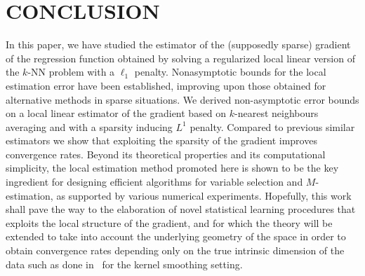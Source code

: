 \section{CONCLUSION}\label{sec:conclusion}
In this paper, we have studied the estimator of the (supposedly sparse) gradient of the regression function obtained by solving a regularized local linear version of the $k$-NN problem with a $\ell_1$ penalty. Nonasymptotic bounds for the local estimation error have been established, improving upon those obtained for alternative methods in sparse situations.
We derived non-asymptotic error bounds on a local linear estimator of the gradient based on $k$-nearest neighbours averaging and with a sparsity inducing $L^1$ penalty. Compared to previous similar estimators we show that exploiting the sparsity of the gradient improves convergence rates.
Beyond its theoretical properties and its computational simplicity, the local estimation method promoted here is shown to be the key ingredient for designing efficient algorithms for variable selection and $M$-estimation, as supported by various numerical experiments. Hopefully, this work shall pave the way to the elaboration of novel statistical learning procedures that exploits the local structure of the gradient, and for which the theory will be extended to take into account the underlying geometry of the space in order to obtain convergence rates depending only on the true intrinsic dimension of the data such as done in~\cite{mukherjeeLearningGradientsManifolds2010} for the kernel smoothing setting.
